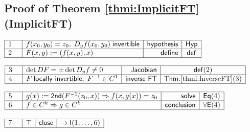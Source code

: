 \documentclass[11pt,reqno]{amsart}
\begin{document}
	\subsection*{Proof of Theorem \protect\ref{thmi:ImplicitFT} (\textsf{ImplicitFT})}
	\noindent$\begin{array}{|m{0.5cm}|l|r|c|}
	\hline
	1 & f(x_{0},y_{0})=z_{0},\;D_{y}f(x_{0},y_{0})\;\mathsf{invertible} & \mathsf{hypothesis} & \mathsf{Hyp} \\ \hline
	2 & F(x,y):=(f(x,y),x) & \mathsf{define} & \mathsf{def} \\ \hline
	\end{array}$
	\par\nointerlineskip\noindent$\begin{array}{|m{0.5cm}|l|r|c|}
	\hline
	3 & \det DF=\pm\det D_{y}f\neq0 & \mathsf{Jacobian} & \mathsf{def}(2) \\ \hline
	4 & F\;\mathsf{locally\ invertible},\;F^{-1}\in C^{1} & \mathsf{inverse\ FT} & \textsf{Thm:}\ref{thmi:InverseFT}(3) \\ \hline
	\end{array}$
	\par\nointerlineskip\noindent$\begin{array}{|m{0.5cm}|l|r|c|}
	\hline
	5 & g(x):=\mathsf{2nd}(F^{-1}(z_{0},x))\Rightarrow f(x,g(x))=z_{0} & \mathsf{solve} & \mathsf{Eq}(4) \\ \hline
	6 & f\in C^{k}\Rightarrow g\in C^{k} & \mathsf{conclusion} & \forall\mathsf{E}(4) \\ \hline
	\end{array}$
	\par\nointerlineskip\noindent$\begin{array}{|m{0.5cm}|l|r|c|}
	\hline
	7 & \top & \mathsf{close} & \to\mathsf{I}(1,\dots,6) \\ \hline
	\end{array}$
	\medskip
	
\end{document}
